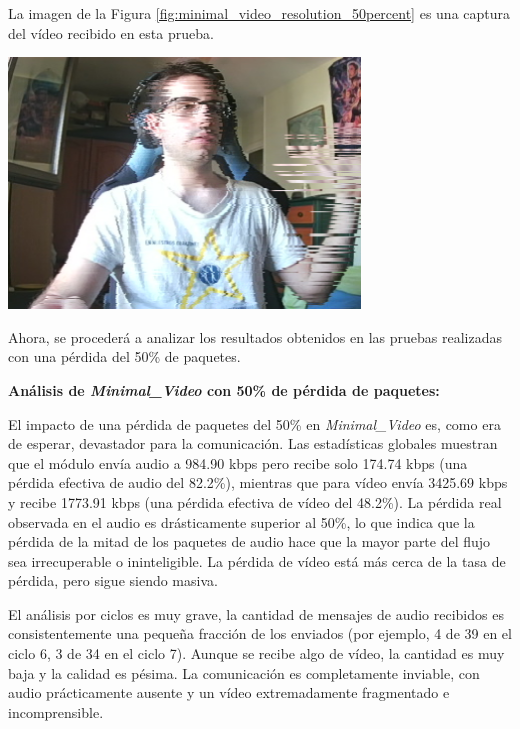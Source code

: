 \newpage

La imagen de la Figura \ref{fig:minimal_video_resolution_50percent} es una captura del vídeo recibido en esta prueba.
\begin{center}
  \includegraphics[width = 0.7\textwidth]{images/VideoRecibido9.3.png}
  \label{fig:minimal_video_resolution_50percent}
\end{center}

\newpage

Ahora, se procederá a analizar los resultados obtenidos en las pruebas realizadas con una pérdida del 50\% de paquetes.
\vspace{\baselineskip}

\textbf{Análisis de \textit{Minimal\_Video} con 50\% de pérdida de paquetes:}
\vspace{\baselineskip}

El impacto de una pérdida de paquetes del 50\% en \textit{Minimal\_Video} es, como era de esperar, devastador para la comunicación. Las estadísticas globales muestran que el módulo envía audio a 984.90 kbps pero recibe solo 174.74 kbps (una pérdida efectiva de audio del 82.2\%), mientras que para vídeo envía 3425.69 kbps y recibe 1773.91 kbps (una pérdida efectiva de vídeo del 48.2\%). La pérdida real observada en el audio es drásticamente superior al 50\%, lo que indica que la pérdida de la mitad de los paquetes de audio hace que la mayor parte del flujo sea irrecuperable o ininteligible. La pérdida de vídeo está más cerca de la tasa de pérdida, pero sigue siendo masiva.
\vspace{\baselineskip}

El análisis por ciclos es muy grave, la cantidad de mensajes de audio recibidos es consistentemente una pequeña fracción de los enviados (por ejemplo, 4 de 39 en el ciclo 6, 3 de 34 en el ciclo 7). Aunque se recibe algo de vídeo, la cantidad es muy baja y la calidad es pésima. La comunicación es completamente inviable, con audio prácticamente ausente y un vídeo extremadamente fragmentado e incomprensible.

